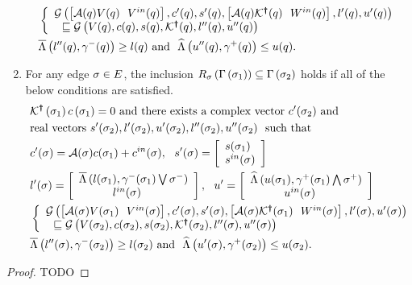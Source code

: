 \begin{lemma}
\begin{enumerate}
\begin{align}
\begin{split}
& \left\{\begin{array}{l}{\mathcal{G}\left(\left[\mathcal{A}(q)V(q)~~V^{in}(q)\right],c^\prime(q),s^\prime(q),\left[\mathcal{A}(q)\mathcal{K}^{\bm{\dagger}}(q)~~W^{in}(q)\right],l^\prime(q),u^\prime(q)\right)}\\{~~\sqsubseteq \mathcal{G}\left(V(q),c(q),s(q),\mathcal{K}^{\bm{\dagger}}(q),l^{\prime\prime}(q),u^{\prime\prime}(q)\right)} \end{array}\right.\\
& \overline{\Lambda}\left(l^{\prime\prime}(q),\gamma^-(q)\right)\geq l(q)~\text{and}~~
\widehat{\Lambda}\left(u^{\prime\prime}(q),\gamma^+(q)\right)\leq u(q).
\end{split}
 \end{align}
\item For any edge $\sigma\in E$, the inclusion
  $R_{\sigma}\left(\Gamma\left(\sigma_{1}\right)\right)
  \subseteq \Gamma\left(\sigma_{2}\right)$ holds if 
  all of the below conditions are satisfied.
\begin{align}~\label{eqn:edgeinv}
\begin{split}
& \mathcal{K}^{\bm{\dagger}}\left(\sigma_{1}\right)c\left(\sigma_{1}\right) =
  0~\text{and there exists a complex
  vector}~c^\prime(\sigma_{2})~\text{and}\\
& \text{real
    vectors}~s^\prime(\sigma_{2}),l^\prime(\sigma_{2}),u^\prime(\sigma_{2}),l^{\prime\prime}(\sigma_{2}),u^{\prime\prime}(\sigma_{2})~~\text{such
  that}\\
& c^\prime(\sigma) = \mathcal{A}(\sigma)c(\sigma_{1})+c^{in}(\sigma),~~s^\prime(\sigma) =
  \left[\begin{array}{l}{s(\sigma_{1})}\\{s^{in}(\sigma)} \end{array}\right]\\
& l^\prime(\sigma) =
  \left[\begin{array}{l}{\overline{\Lambda}\left(l(\sigma_{1}),\gamma^-(\sigma_{1})\bigvee\sigma^-\right)}\\{~~~~~~~~~l^{in}(\sigma)~~~} \end{array}\right],~~u^\prime =
  \left[\begin{array}{l}{\widehat{\Lambda}\left(u(\sigma_{1}),\gamma^+(\sigma_{1})\bigwedge\sigma^+\right)}\\{~~~~~~~~~u^{in}(\sigma)~~~} \end{array}\right]\\
& \left\{\begin{array}{l}{\mathcal{G}\left(\left[\mathcal{A}(\sigma)V(\sigma_{1})~~V^{in}(\sigma)\right],c^\prime(\sigma),s^\prime(\sigma),\left[\mathcal{A}(\sigma)\mathcal{K}^{\bm{\dagger}}(\sigma_{1})~~W^{in}(\sigma)\right],l^\prime(\sigma),u^\prime(\sigma)\right)}\\{~~\sqsubseteq \mathcal{G}\left(V(\sigma_{2}),c(\sigma_{2}),s(\sigma_{2}),\mathcal{K}^{\bm{\dagger}}(\sigma_{2}),l^{\prime\prime}(\sigma),u^{\prime\prime}(\sigma)\right)} \end{array}\right.\\
& \overline{\Lambda}\left(l^{\prime\prime}(\sigma),\gamma^-(\sigma_{2})\right)\geq l(\sigma_{2})~\text{and}~~
\widehat{\Lambda}\left(u^\prime(\sigma),\gamma^+(\sigma_{2})\right)\leq u(\sigma_{2}).
\end{split}
\end{align}
\end{enumerate}
\end{lemma}
\begin{proof}
{\color{red} TODO}
\end{proof}

